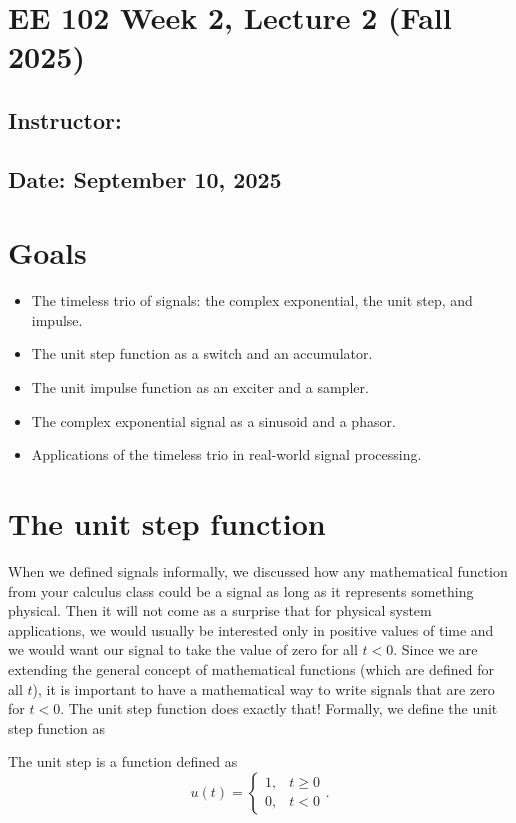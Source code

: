 \documentclass{ee102_notes}
\renewcommand{\releasedate}{September 10, 2025}
\begin{document}
\section*{EE 102 Week 2, Lecture 2 (Fall 2025)}
\subsection*{Instructor: \instructor}
\subsection*{Date: \releasedate}
\section{Goals}
\begin{itemize}
    \item The timeless trio of signals: the complex exponential, the unit step, and impulse.
    \item The unit step function as a switch and an accumulator.
    \item The unit impulse function as an exciter and a sampler.
    \item The complex exponential signal as a sinusoid and a phasor.
    \item Applications of the timeless trio in real-world signal processing.
\end{itemize}
\section{The unit step function}
When we defined signals informally, we discussed how any mathematical function from your calculus class could be a signal as long as it represents something physical. Then it will not come as a surprise that for physical system applications, we would usually be interested only in positive values of time and we would want our signal to take the value of zero for all $t < 0$. Since we are extending the general concept of mathematical functions (which are defined for all $t$), it is important to have a mathematical way to write signals that are zero for $t < 0$. The unit step function does exactly that! Formally, we define the unit step function as
\begin{definition}
The unit step is a function defined as
\[
u(t) = \begin{cases}
1, & t \geq 0 \\
0, & t < 0
\end{cases}.
\]
\end{definition}
\end{document}
